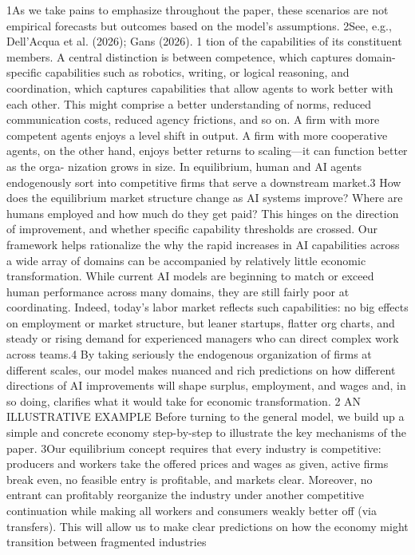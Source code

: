 1As we take pains to emphasize throughout the paper, these scenarios are not empirical forecasts
but outcomes based on the model’s assumptions.
2See, e.g., Dell’Acqua et al. (2026); Gans (2026).
1
tion of the capabilities of its constituent members. A central distinction is between
competence, which captures domain-specific capabilities such as robotics, writing, or
logical reasoning, and coordination, which captures capabilities that allow agents to
work better with each other. This might comprise a better understanding of norms,
reduced communication costs, reduced agency frictions, and so on. A firm with more
competent agents enjoys a level shift in output. A firm with more cooperative agents,
on the other hand, enjoys better returns to scaling—it can function better as the orga-
nization grows in size. In equilibrium, human and AI agents endogenously sort into
competitive firms that serve a downstream market.3
How does the equilibrium market structure change as AI systems improve? Where are
humans employed and how much do they get paid? This hinges on the direction of
improvement, and whether specific capability thresholds are crossed. Our framework
helps rationalize the why the rapid increases in AI capabilities across a wide array
of domains can be accompanied by relatively little economic transformation. While
current AI models are beginning to match or exceed human performance across many
domains, they are still fairly poor at coordinating. Indeed, today’s labor market reflects
such capabilities: no big effects on employment or market structure, but leaner startups,
flatter org charts, and steady or rising demand for experienced managers who can
direct complex work across teams.4 By taking seriously the endogenous organization
of firms at different scales, our model makes nuanced and rich predictions on how
different directions of AI improvements will shape surplus, employment, and wages
and, in so doing, clarifies what it would take for economic transformation.
2 AN ILLUSTRATIVE EXAMPLE
Before turning to the general model, we build up a simple and concrete economy
step-by-step to illustrate the key mechanisms of the paper.
3Our equilibrium concept requires that every industry is competitive: producers and workers take
the offered prices and wages as given, active firms break even, no feasible entry is profitable, and
markets clear. Moreover, no entrant can profitably reorganize the industry under another competitive
continuation while making all workers and consumers weakly better off (via transfers). This will allow
us to make clear predictions on how the economy might transition between fragmented industries
